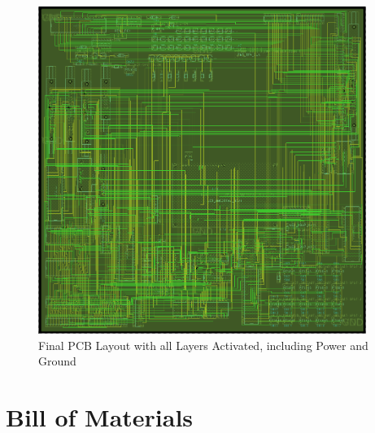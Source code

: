 \begin{appendices}
        \begin{figure}[ht]
            \begin{center}
                \includegraphics[width=0.95\textwidth]{figures/all.png}
                \caption{Final PCB Layout with all Layers Activated, including Power and Ground} \label{fig:all}
            \end{center}
        \end{figure}

        \clearpage
        \newpage

    \section{Bill of Materials} \label{appendix:bom}


\end{appendices}
